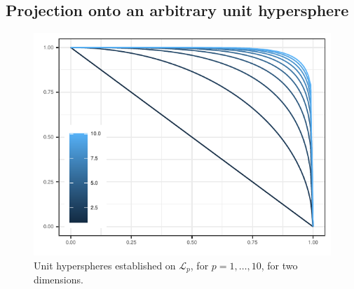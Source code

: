 \subsection{Projection onto an arbitrary unit hypersphere}

\begin{figure}[ht]
    \centering
    \includegraphics{images/p_sphere}
    \caption{Unit hyperspheres established on $\mathcal{L}_p$, for $p = 1,\ldots,10$, for two dimensions.\label{fig:psphere}}
\end{figure}

